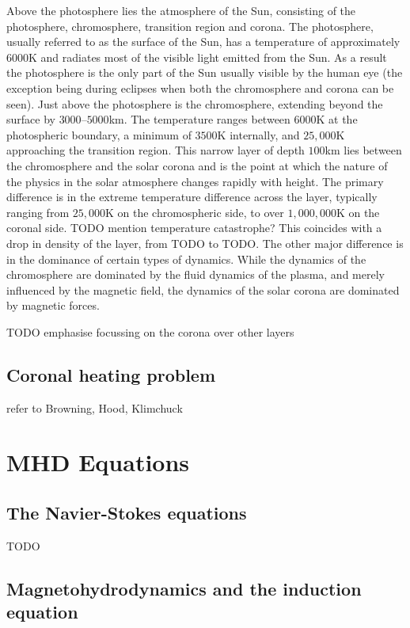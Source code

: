 Above the photosphere lies the atmosphere of the Sun, consisting of the photosphere, chromosphere, transition region and corona. The photosphere, usually referred to as the surface of the Sun, has a temperature of approximately $6000$K and radiates most of the visible light emitted from the Sun. As a result the photosphere is the only part of the Sun usually visible by the human eye (the exception being during eclipses when both the chromosphere and corona can be seen). Just above the photosphere is the chromosphere, extending beyond the surface by $3000$--$5000$km. The temperature ranges between $6000$K at the photospheric boundary, a minimum of $3500$K internally, and $25,000$K approaching the transition region. This narrow layer of depth $100$km lies between the chromosphere and the solar corona and is the point at which the nature of the physics in the solar atmosphere changes rapidly with height. The primary difference is in the extreme temperature difference across the layer, typically ranging from $25,000$K on the chromospheric side, to over $1,000,000$K on the coronal side. TODO mention temperature catastrophe? This coincides with a drop in density of the layer, from TODO to TODO. The other major difference is in the dominance of certain types of dynamics. While the dynamics of the chromosphere are dominated by the fluid dynamics of the plasma, and merely influenced by the magnetic field, the dynamics of the solar corona are dominated by magnetic forces.

TODO emphasise focussing on the corona over other layers

\subsection{Coronal heating problem}

refer to Browning, Hood, Klimchuck

\section{MHD Equations}

\subsection{The Navier-Stokes equations}

TODO

\subsection{Magnetohydrodynamics and the induction equation}

